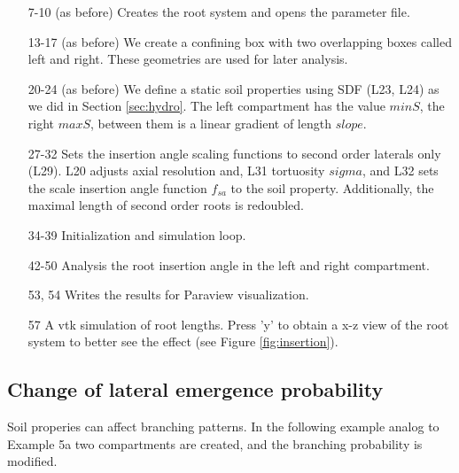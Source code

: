 \begin{itemize}

\item[7-10] (as before) Creates the root system and opens the parameter file.

\item[13-17](as before) We create a confining box with two overlapping boxes called left and right. These geometries are used for later analysis.

\item[20-24] (as before) We define a static soil properties using SDF (L23, L24) as we did in Section \ref{sec:hydro}. 
The left compartment has the value $minS$, the right $maxS$, between them is a linear gradient of length $slope$.

\item[27-32] Sets the insertion angle scaling functions to second order laterals only (L29). L20 adjusts axial resolution and, L31 tortuosity $sigma$, and L32 sets the scale insertion angle function $f_{sa}$ to the soil property. Additionally, the maximal length of second order roots is redoubled. 

\item[34-39] Initialization and simulation loop.

\item[42-50] Analysis the root insertion angle in the left and right compartment. 

\item[53, 54] Writes the results for Paraview visualization.

\item[57] A vtk simulation of root lengths. Press 'y' to obtain a x-z view of the root system to better see the effect (see Figure \ref{fig:insertion}). 

\end{itemize}




\subsection{Change of lateral emergence probability} \label{sec:branching}

Soil properies can affect branching patterns. In the following example analog to Example 5a two compartments are created, and the branching probability is modified.




